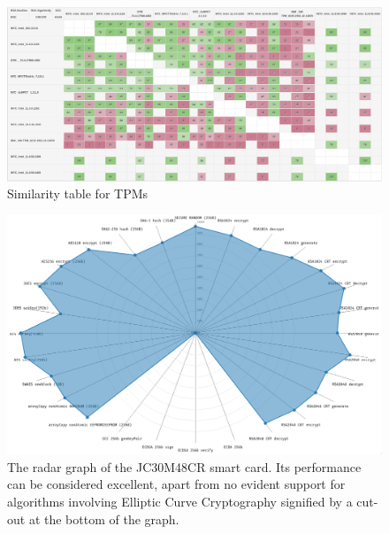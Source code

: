 \begin{landscape}
    \begin{figure}[!t]
        \includegraphics[width=\linewidth, height=\textwidth]{img/visualizations/tpm-similarity.png}
        \caption{Similarity table for TPMs}
    \end{figure}
\end{landscape}

\begin{landscape}
\begin{figure}[!t]
    \centering
    \includegraphics[width=\linewidth]{img/visualizations/JC30M48CR radar graph.png}
    \caption{
    The radar graph of the JC30M48CR smart card. Its performance can be considered excellent, apart from no evident support for algorithms involving Elliptic Curve Cryptography signified by a cut-out at the bottom of the graph.
    }
\end{figure}
\end{landscape}

